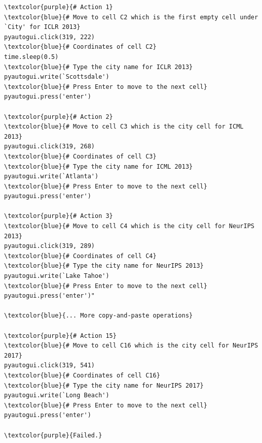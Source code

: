 \begin{tcolorbox}[title={Libreoffice calc Task: \textit{I now want to count the meeting cities of the three machine learning conferences in the past ten years from 2013 to 2019(including 2013 and 2019). I have listed the names and years of the conferences in excel. Please fill in the vacant locations.}}]


\begin{Verbatim}[commandchars=\\\{\}]
\textcolor{purple}{# Action 1}
\textcolor{blue}{# Move to cell C2 which is the first empty cell under `City' for ICLR 2013}
pyautogui.click(319, 222)  
\textcolor{blue}{# Coordinates of cell C2}
time.sleep(0.5)
\textcolor{blue}{# Type the city name for ICLR 2013}
pyautogui.write(`Scottsdale')
\textcolor{blue}{# Press Enter to move to the next cell}
pyautogui.press('enter')

\textcolor{purple}{# Action 2}
\textcolor{blue}{# Move to cell C3 which is the city cell for ICML 2013}
pyautogui.click(319, 268)  
\textcolor{blue}{# Coordinates of cell C3}
\textcolor{blue}{# Type the city name for ICML 2013}
pyautogui.write(`Atlanta')
\textcolor{blue}{# Press Enter to move to the next cell}
pyautogui.press('enter')

\textcolor{purple}{# Action 3}
\textcolor{blue}{# Move to cell C4 which is the city cell for NeurIPS 2013}
pyautogui.click(319, 289)  
\textcolor{blue}{# Coordinates of cell C4}
\textcolor{blue}{# Type the city name for NeurIPS 2013}
pyautogui.write(`Lake Tahoe')
\textcolor{blue}{# Press Enter to move to the next cell}
pyautogui.press('enter')"

\textcolor{blue}{... More copy-and-paste operations}

\textcolor{purple}{# Action 15}
\textcolor{blue}{# Move to cell C16 which is the city cell for NeurIPS 2017}
pyautogui.click(319, 541)  
\textcolor{blue}{# Coordinates of cell C16}
\textcolor{blue}{# Type the city name for NeurIPS 2017}
pyautogui.write(`Long Beach')
\textcolor{blue}{# Press Enter to move to the next cell}
pyautogui.press('enter')

\textcolor{purple}{Failed.}
\end{Verbatim}
\end{tcolorbox}



